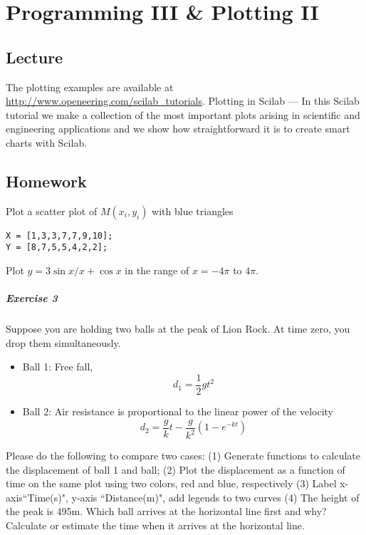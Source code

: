 \documentclass[a4paper]{book}
\begin{document}
\chapter{Programming III \& Plotting II}
\section{Lecture}
The plotting examples are available at 
\url{http://www.openeering.com/scilab_tutorials}.
\textsf{Plotting in Scilab}
---
In this Scilab tutorial we make a collection of the most important plots arising in scientific and engineering applications and we show how straightforward it is to create smart charts with Scilab.



\section{Homework}
Plot a scatter plot of $M(x_i,y_i)$ with blue triangles
\begin{lstlisting}
X = [1,3,3,7,7,9,10];
Y = [8,7,5,5,4,2,2];
\end{lstlisting}



Plot $y=3 \sin x /x + \cos x$ in the range of
$x=-4 \pi $ to $4 \pi$.



\paragraph{Exercise 3}
Suppose you are holding two balls at the peak of Lion Rock. At time zero, you drop them simultaneously.
\begin{itemize}
\item Ball 1: Free fall, 
\[
d_1 = \frac{1}{2} g t^2
\]
\item Ball 2: Air resistance is proportional to the linear power of the velocity
\[
d_2 = \frac{g}{k} t - \frac{g}{k^2} (1-e^{-kt})
\]
\end{itemize}

Please do the following to compare two cases:
(1) Generate functions to calculate the displacement of ball 1 and ball;
(2) Plot the displacement as a function of time on the same plot using two colors, red and blue, respectively
(3) Label x-axis``Time(s)", y-axis ``Distance(m)",  add legends to two curves 
(4) The height of the peak is 495m. Which ball arrives at the horizontal line first and why? Calculate or estimate the time when it arrives at the horizontal line.
\end{document}
